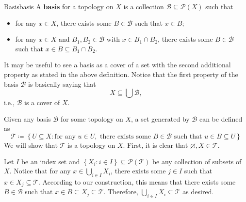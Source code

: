 \documentclass[math]{amznotes}
\theoremstyle{remark}
\begin{document}
\begin{dfnbox}{Basis}{basis}
    A {\color{red} \textbf{basis}} for a topology on $X$ is a collection $\mathcal{B} \subseteq \mathcal{P}\left(X\right)$ such that 
    \begin{itemize}
        \item for any $x \in X$, there exists some $B \in \mathcal{B}$ such that $x \in B$;
        \item for any $x \in X$ and $B_1, B_2 \in \mathcal{B}$ with $x \in B_1 \cap B_2$, there exists some $B \in \mathcal{B}$ such that $x \in B \subseteq B_1 \cap B_2$.
    \end{itemize}
\end{dfnbox}
It may be useful to see a basis as a cover of a set with the second additional property as stated in the above definition. Notice that the first property of the basis $\mathcal{B}$ is basically saying that 
\begin{equation*}
    X \subseteq \bigcup \mathcal{B},
\end{equation*}
i.e., $\mathcal{B}$ is a cover of $X$.

Given any basis $\mathcal{B}$ for some topology on $X$, a set generated by $\mathcal{B}$ can be defined as 
\begin{equation*}
    \mathcal{T} \coloneqq \left\{U \subseteq X \colon \textrm{for any } u \in U, \textrm{ there exists some } B \in \mathcal{B} \textrm{ such that } u \in B \subseteq U\right\}
\end{equation*}
We will show that $\mathcal{T}$ is a topology on $X$. First, it is clear that $\varnothing, X \in \mathcal{T}$. 

Let $I$ be an index set and $\left\{X_i \colon i \in I\right\}\subseteq \mathcal{P}\left(\mathcal{T}\right)$ be any collection of subsets of $X$. Notice that for any $x \in \bigcup_{i \in I}X_i$, there exists some $j \in I$ such that $x \in X_j \subseteq \mathcal{T}$. According to our construction, this means that there exists some $B \in \mathcal{B}$ such that $x \in B \subseteq X_j \subseteq \mathcal{T}$. Therefore, $\bigcup_{i \in I}X_i \subseteq \mathcal{T}$ as desired.
\end{document}
